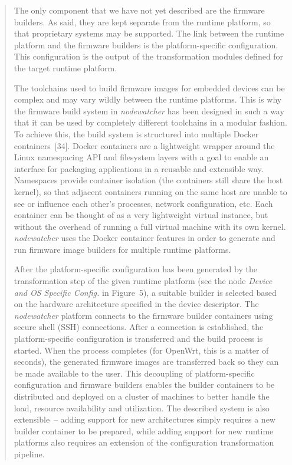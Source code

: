 \documentclass[12pt,twoside,a4paper]{report}
\newcommand{\nodewatcher}{\textit{nodewatcher}}
\begin{document}
\begin{quote}
The only component that we have not yet described are the firmware builders.
As said, they are kept separate from the runtime platform, so that proprietary systems may be supported.
The link between the runtime platform and the firmware builders is the platform-specific configuration.
This configuration is the output of the transformation modules defined for the target runtime platform.

The toolchains used to build firmware images for embedded devices can be complex and may vary wildly between the runtime platforms.
This is why the firmware build system in \nodewatcher{} has been designed in such a way that it can be used by completely different toolchains in a modular fashion.
To achieve this, the build system is structured into multiple Docker containers~[34].
Docker containers are a lightweight wrapper around the Linux namespacing API and filesystem layers with a goal to enable an interface for packaging applications in a reusable and extensible way.
Namespaces provide container isolation (the containers still share the host kernel), so that adjacent containers running on the same host are unable to see or influence each other's processes, network configuration, etc.
Each container can be thought of as a very lightweight virtual instance, but without the overhead of running a full virtual machine with its own kernel.
\nodewatcher{} uses the Docker container features in order to generate and run firmware image builders for multiple runtime platforms.

After the platform-specific configuration has been generated by the transformation step of the given runtime platform (see the node \textit{Device and OS Specific Config.} in Figure~5), a suitable builder is selected based on the hardware architecture specified in the device descriptor.
The \nodewatcher{} platform connects to the firmware builder containers using secure shell (SSH) connections.
After a connection is established, the platform-specific configuration is transferred and the build process is started.
When the process completes (for OpenWrt, this is a matter of seconds), the generated firmware images are transferred back so they can be made available to the user.
This decoupling of platform-specific configuration and firmware builders enables the builder containers to be distributed and deployed on a cluster of machines to better handle the load, resource availability and utilization.
The described system is also extensible~-- adding support for new architectures simply requires a new builder container to be prepared, while adding support for new runtime platforms also requires an extension of the configuration transformation pipeline.
\end{quote}
\end{document}
